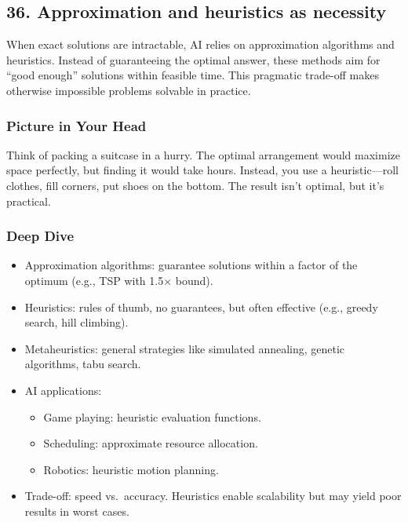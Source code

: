 \documentclass[
  letterpaper,
  DIV=11,
  numbers=noendperiod]{scrreprt}
\providecommand{\tightlist}{%
  \setlength{\itemsep}{0pt}\setlength{\parskip}{0pt}}
\begin{document}
\subsection{36. Approximation and heuristics as
necessity}\label{approximation-and-heuristics-as-necessity}

When exact solutions are intractable, AI relies on approximation
algorithms and heuristics. Instead of guaranteeing the optimal answer,
these methods aim for ``good enough'' solutions within feasible time.
This pragmatic trade-off makes otherwise impossible problems solvable in
practice.

\subsubsection{Picture in Your Head}\label{picture-in-your-head-35}

Think of packing a suitcase in a hurry. The optimal arrangement would
maximize space perfectly, but finding it would take hours. Instead, you
use a heuristic---roll clothes, fill corners, put shoes on the bottom.
The result isn't optimal, but it's practical.

\subsubsection{Deep Dive}\label{deep-dive-35}

\begin{itemize}
\item
  Approximation algorithms: guarantee solutions within a factor of the
  optimum (e.g., TSP with 1.5× bound).
\item
  Heuristics: rules of thumb, no guarantees, but often effective (e.g.,
  greedy search, hill climbing).
\item
  Metaheuristics: general strategies like simulated annealing, genetic
  algorithms, tabu search.
\item
  AI applications:

  \begin{itemize}
  \tightlist
  \item
    Game playing: heuristic evaluation functions.
  \item
    Scheduling: approximate resource allocation.
  \item
    Robotics: heuristic motion planning.
  \end{itemize}
\item
  Trade-off: speed vs.~accuracy. Heuristics enable scalability but may
  yield poor results in worst cases.
\end{itemize}
\end{document}
